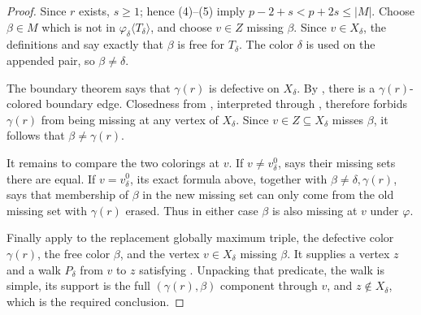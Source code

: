 \begin{proof}
Since $r$ exists, $s\geq1$; hence (4)--(5) imply
$p-2+s<p+2s\leq|M|$.  Choose $\beta\in M$ which is not in
$\varphi_\delta\langle T_\delta\rangle$, and choose
$v\in Z$ missing $\beta$.  Since $v\in X_\delta$, the definitions
 and  say exactly that
$\beta$ is free for $T_\delta$.  The color $\delta$ is used on the
appended pair, so $\beta\ne\delta$.

The boundary theorem
 says that
$\gamma(r)$ is defective on $X_\delta$.  By
, there is a $\gamma(r)$-colored boundary edge.
Closedness from , interpreted through
, therefore forbids $\gamma(r)$ from
being missing at any vertex of $X_\delta$.  Since $v\in Z\subseteq
X_\delta$ misses $\beta$, it follows that $\beta\ne\gamma(r)$.

It remains to compare the two colorings at $v$.  If
$v\ne v^0_\delta$,  says their
missing sets there are equal.  If $v=v^0_\delta$, its exact formula above,
together with $\beta\ne\delta,\gamma(r)$, says that membership of $\beta$
in the new missing set can only come from the old missing set with
$\gamma(r)$ erased.  Thus in either case $\beta$ is also missing at $v$
under $\varphi$.

Finally apply  to the replacement
globally maximum triple, the defective color $\gamma(r)$, the free color
$\beta$, and the vertex $v\in X_\delta$ missing $\beta$.  It supplies a
vertex $z$ and a walk $P_\delta$ from $v$ to $z$ satisfying
.  Unpacking that predicate, the walk
is simple, its support is the full $(\gamma(r),\beta)$ component through
$v$, and $z\notin X_\delta$, which is the required conclusion.
\end{proof}
